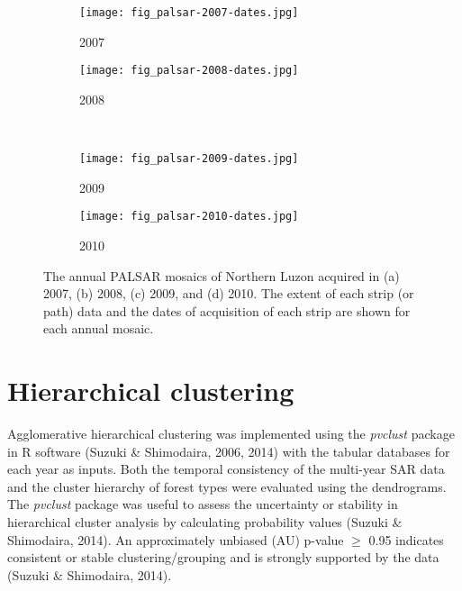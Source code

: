 \begin{figure}[!ht] \centering
	\captionsetup[subfigure]{width=2.0in} %
	\begin{subfigure}[t]{0.49\textwidth}
		\texttt{[image: fig\_palsar-2007-dates.jpg]}
		\caption[Annual PALSAR mosaics.]{2007}
		\label{fig: method-fig3.6a}
	\end{subfigure}
	\begin{subfigure}[t]{0.49\textwidth}
		\texttt{[image: fig\_palsar-2008-dates.jpg]}
		\caption[Annual PALSAR mosaics.]{2008}
		\label{fig: method-fig3.6b}
	\end{subfigure}\\
	\vspace{10pt}
	\begin{subfigure}[t]{0.49\textwidth}
		\texttt{[image: fig\_palsar-2009-dates.jpg]}
		\caption[Annual PALSAR mosaics.]{2009}
		\label{fig: method-fig3.6c}
	\end{subfigure}
	\begin{subfigure}[t]{0.49\textwidth}
		\texttt{[image: fig\_palsar-2010-dates.jpg]}
		\caption[Annual PALSAR mosaics.]{2010}
		\label{fig: method-fig3.6d}
	\end{subfigure}
	\caption[The annual PALSAR mosaics of Northern Luzon acquired in 2007, 2008, 2009, and 2010.]{The annual PALSAR mosaics of Northern Luzon acquired in (a) 2007, (b) 2008, (c) 2009, and (d) 2010. The extent of each strip (or path) data and the dates of acquisition of each strip are shown for each annual mosaic.}
	\label{fig: method-fig3.6}
\end{figure}

\section{Hierarchical clustering}
\label{sec: method-clustering}

Agglomerative hierarchical clustering was implemented using the \textit{pvclust} package in R software (Suzuki \& Shimodaira, 2006, 2014) with the tabular databases for each year as inputs. Both the temporal consistency of the multi-year SAR data and the cluster hierarchy of forest types were evaluated using the dendrograms. The \textit{pvclust} package was useful to assess the uncertainty or stability in hierarchical cluster analysis by calculating probability values (Suzuki \& Shimodaira, 2014). An approximately unbiased (AU) p-value $\geq$ 0.95 indicates consistent or stable clustering/grouping and is strongly supported by the data (Suzuki \& Shimodaira, 2014).\\

